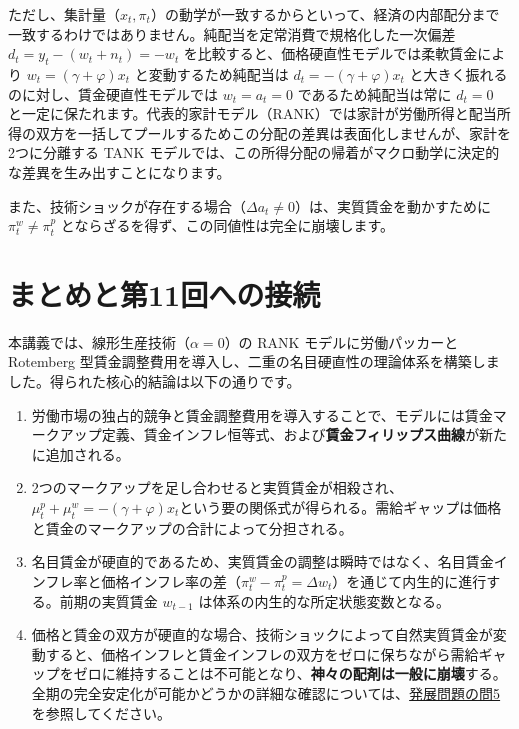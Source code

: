 \documentclass[
  japanese,
  lualatex,
  ja=standard,
  12pt,
  a4paper]{ltjsarticle}
\providecommand{\tightlist}{%
  \setlength{\itemsep}{0pt}\setlength{\parskip}{0pt}}
\begin{document}
ただし、集計量（\(x_t, \pi_t\)）の動学が一致するからといって、経済の内部配分まで一致するわけではありません。純配当を定常消費で規格化した一次偏差
\(d_t = y_t - (w_t + n_t) = -w_t\)
を比較すると、価格硬直性モデルでは柔軟賃金により
\(w_t = (\gamma+\varphi)x_t\) と変動するため純配当は
\(d_t = -(\gamma+\varphi)x_t\)
と大きく振れるのに対し、賃金硬直性モデルでは \(w_t=a_t=0\)
であるため純配当は常に \(d_t=0\)
と一定に保たれます。代表的家計モデル（RANK）では家計が労働所得と配当所得の双方を一括してプールするためこの分配の差異は表面化しませんが、家計を2つに分離する
TANK
モデルでは、この所得分配の帰着がマクロ動学に決定的な差異を生み出すことになります。

また、技術ショックが存在する場合（\(\Delta a_t \neq 0\)）は、実質賃金を動かすために
\(\pi_t^w \neq \pi_t^p\)
とならざるを得ず、この同値性は完全に崩壊します。

\section{まとめと第11回への接続}\label{ux307eux3068ux3081ux3068ux7b2c11ux56deux3078ux306eux63a5ux7d9a}

本講義では、線形生産技術（\(\alpha=0\)）の RANK モデルに労働パッカーと
Rotemberg
型賃金調整費用を導入し、二重の名目硬直性の理論体系を構築しました。得られた核心的結論は以下の通りです。

\begin{enumerate}
\def\labelenumi{\arabic{enumi}.}
\tightlist
\item
  労働市場の独占的競争と賃金調整費用を導入することで、モデルには賃金マークアップ定義、賃金インフレ恒等式、および\textbf{賃金フィリップス曲線}が新たに追加される。
\item
  2つのマークアップを足し合わせると実質賃金が相殺され、\textbf{\(\mu_t^p + \mu_t^w = -(\gamma+\varphi)x_t\)}という要の関係式が得られる。需給ギャップは価格と賃金のマークアップの合計によって分担される。
\item
  名目賃金が硬直的であるため、実質賃金の調整は瞬時ではなく、名目賃金インフレ率と価格インフレ率の差（\(\pi_t^w - \pi_t^p = \Delta w_t\)）を通じて内生的に進行する。前期の実質賃金
  \(w_{t-1}\) は体系の内生的な所定状態変数となる。
\item
  価格と賃金の双方が硬直的な場合、技術ショックによって自然実質賃金が変動すると、価格インフレと賃金インフレの双方をゼロに保ちながら需給ギャップをゼロに維持することは不可能となり、\textbf{神々の配剤は一般に崩壊}する。全期の完全安定化が可能かどうかの詳細な確認については、\hyperref[sec-lecture10-extensions]{発展問題の問5}を参照してください。
\end{enumerate}
\end{document}
